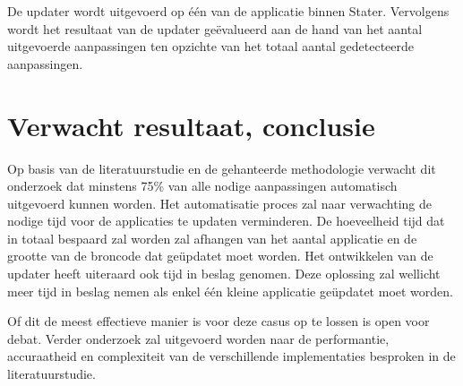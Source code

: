 De updater wordt uitgevoerd op één van de applicatie binnen Stater.
Vervolgens wordt het resultaat van de updater geëvalueerd aan de hand van het aantal uitgevoerde aanpassingen ten opzichte van het totaal aantal gedetecteerde aanpassingen.

\section{Verwacht resultaat, conclusie}
\label{sec:verwachte_resultaten}

Op basis van de literatuurstudie en de gehanteerde methodologie verwacht dit onderzoek dat minstens 75\% van alle nodige aanpassingen automatisch uitgevoerd kunnen worden.
Het automatisatie proces zal naar verwachting de nodige tijd voor de applicaties te updaten verminderen.
De hoeveelheid tijd dat in totaal bespaard zal worden zal afhangen van het aantal applicatie en de grootte van de broncode dat geüpdatet moet worden.
Het ontwikkelen van de updater heeft uiteraard ook tijd in beslag genomen.
Deze oplossing zal wellicht meer tijd in beslag nemen als enkel één kleine applicatie geüpdatet moet worden.

Of dit de meest effectieve manier is voor deze casus op te lossen is open voor debat.
Verder onderzoek zal uitgevoerd worden naar de performantie, accuraatheid en complexiteit van de verschillende implementaties besproken in de literatuurstudie.

